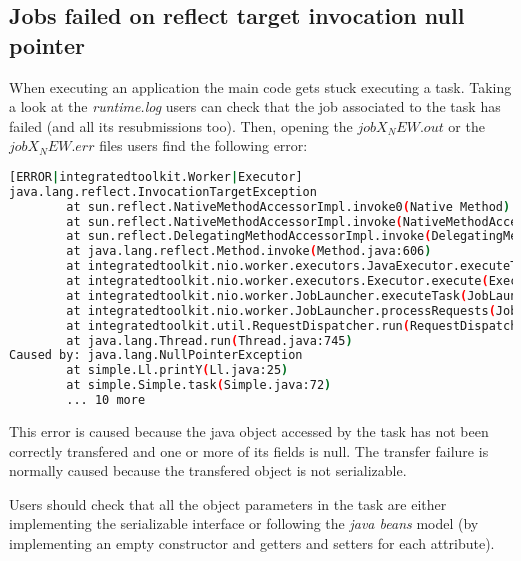 \subsection{Jobs failed on reflect target invocation null pointer}
When executing an application the main code gets stuck executing a task. Taking a look at the \textit{runtime.log} users can check
that the job associated to the task has failed (and all its resubmissions too). Then, opening the \textit{$jobX_NEW.out$} or the
\textit{$jobX_NEW.err$} files users find the following error:

\begin{lstlisting}[language=bash]
[ERROR|integratedtoolkit.Worker|Executor]
java.lang.reflect.InvocationTargetException
        at sun.reflect.NativeMethodAccessorImpl.invoke0(Native Method)
        at sun.reflect.NativeMethodAccessorImpl.invoke(NativeMethodAccessorImpl.java:57)
        at sun.reflect.DelegatingMethodAccessorImpl.invoke(DelegatingMethodAccessorImpl.java:43)
        at java.lang.reflect.Method.invoke(Method.java:606)
        at integratedtoolkit.nio.worker.executors.JavaExecutor.executeTask(JavaExecutor.java:154)
        at integratedtoolkit.nio.worker.executors.Executor.execute(Executor.java:42)
        at integratedtoolkit.nio.worker.JobLauncher.executeTask(JobLauncher.java:46)
        at integratedtoolkit.nio.worker.JobLauncher.processRequests(JobLauncher.java:34)
        at integratedtoolkit.util.RequestDispatcher.run(RequestDispatcher.java:46)
        at java.lang.Thread.run(Thread.java:745)
Caused by: java.lang.NullPointerException
        at simple.Ll.printY(Ll.java:25)
        at simple.Simple.task(Simple.java:72)
        ... 10 more
\end{lstlisting}

This error is caused because the java object accessed by the task has not been correctly transfered and one or more of its fields
is null. The transfer failure is normally caused because the transfered object is not serializable. 

Users should check that all the object parameters in the task are either implementing the serializable interface or following 
the \textit{java beans} model (by implementing an empty constructor and getters and setters for each attribute).
